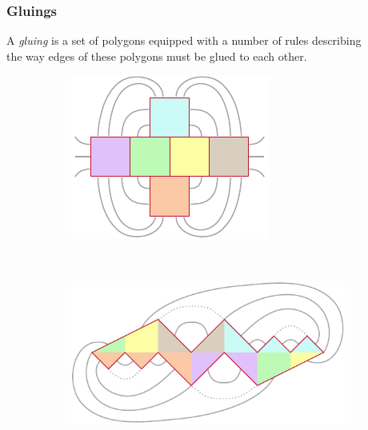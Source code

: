 
\begin{frame}
\frametitle{Gluings}

\begin{definition}
\label{def:razvertka}
	A {\itshape gluing} is a set of polygons equipped with
	a number of rules describing \\ the way
	edges of these polygons must be glued to each other.
\end{definition} \bigskip

\begin{figure}
	\centering
	\begin{subfigure}[m]{0.41\textwidth}
		\centering
		\includegraphics[scale=1.12]{figs_pres/alex_example_1}
	\end{subfigure}
~
	\centering
	\begin{subfigure}[m]{0.48\textwidth}
		\centering
		\includegraphics[scale=0.81]{figs_pres/alex_example_stefan_1}
	\end{subfigure}
\end{figure} \vspace{2.8mm}
\end{frame}


